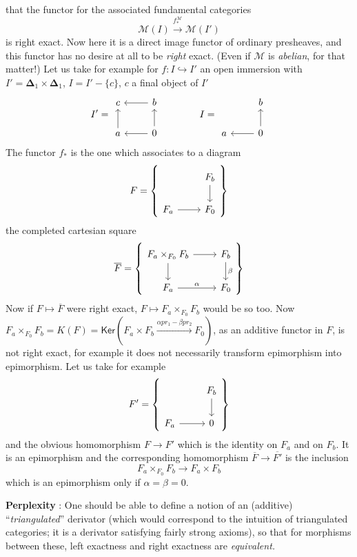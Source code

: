 that the functor for the associated fundamental categories
\[ \mathcal{M}(I) \xrightarrow{f^{\mathcal{M}}_*} \mathcal{M}(I') \]
is right exact. Now here it is a direct image functor of ordinary presheaves, and this functor has no desire at all to be \textit{right} exact. (Even if $\mathcal{M}$ is \textit{abelian}, for that matter!) Let us take for example for $f : I \hookrightarrow I'$ an open immersion with $I' = \boldsymbol{\Delta}_1 \times \boldsymbol{\Delta}_1$, $I = I' - \{c\}$, $c$ a final object of $I'$
\[
I' = \begin{tikzcd}
c & b \arrow[l] \\
a \arrow[u] & 0 \arrow[l] \arrow[u]
\end{tikzcd}
\qquad\qquad
I = \begin{tikzcd}
 & b \\
a & 0 \arrow[l] \arrow[u]
\end{tikzcd}
\]
The functor $f_*$ is the one which associates to a diagram
\[
F = \left\{
\begin{tikzcd}
 & F_b \arrow[d] \\
F_a \arrow[r] & F_0
\end{tikzcd}
\right\}
\]
the completed cartesian square
\[
\overline{F} = \left\{
\begin{tikzcd}
F_a \times_{F_0} F_b \arrow[r] \arrow[d] & F_b \arrow[d, "\beta"] \\
F_a \arrow[r, "\alpha"] & F_0
\end{tikzcd}
\right\}
\]
Now if $F \mapsto \overline{F}$ were right exact, $F \mapsto F_a \times_{F_0} F_b$ would be so too. Now $F_a \times_{F_0} F_b = K(F) = \mathsf{Ker}(F_a \times F_b \xrightarrow{\alpha pr_1 - \beta pr_2} F_0)$, as an additive functor in $F$, is not right exact, for example it does not necessarily transform epimorphism into epimorphism. Let us take for example
\[
F' = \left\{
\begin{tikzcd}
 & F_b \arrow[d] \\
F_a \arrow[r] & 0
\end{tikzcd}
\right\}
\]
and the obvious homomorphism $F \to F'$ which is the identity on
$F_a$ and on $F_b$. It is an epimorphism and the corresponding homomorphism $\overline{F} \to \overline{F'}$ is the inclusion
\[ F_a \times_{F_0} F_b \longrightarrow F_a \times F_b \]
which is an epimorphism only if $\alpha = \beta = 0$.

\textbf{Perplexity} : One should be able to define a notion of an (additive) ``\textit{triangulated}'' derivator (which would correspond to the intuition of triangulated categories; it is a derivator satisfying fairly strong axioms), so that for morphisms between these, left exactness and right exactness are \textit{equivalent.}

